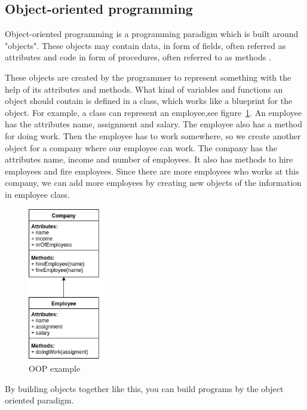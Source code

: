 \documentclass {article}
\begin{document}
\subsection{Object-oriented programming}
Object-oriented programming is a programming paradigm which is built around "objects". These objects may contain data, in form of fields, often referred as attributes and code in form of procedures, often referred to as methods \cite{kindler}.

These objects are created by the programmer to represent something with the help of its attributes and methods. What kind of variables and functions an object should contain is defined in a class, which works like a blueprint for the object. For example, a class can represent an employee,see figure~\ref{fig:oop-example}. An employee has the attributes name, assignment and salary. The employee also has a method for doing work. Then the employee has to work somewhere, so we create another object for a company where our employee can work. The company has the attributes name, income and number of employees. It also has methods to hire employees and fire employees. Since there are more employees who works at this company, we can add more employees by creating new objects of the information in employee class.

\begin{figure}[H]
\centering
\includegraphics[width=0.3\textwidth]{oop-example}

\caption {OOP example}
\label{fig:oop-example}
\end {figure}

By building objects together like this, you can build programs by the object oriented paradigm.  
\end{document}
